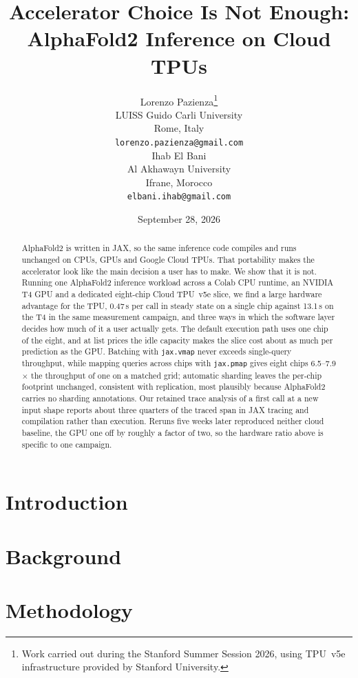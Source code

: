 \documentclass{article}
\title{Accelerator Choice Is Not Enough:\\
AlphaFold2 Inference on Cloud TPUs}
\date{September 28, 2026}
\author{
  Lorenzo Pazienza\thanks{Work carried out during the Stanford Summer
  Session 2026, using TPU~v5e infrastructure provided by Stanford
  University.} \\
  LUISS Guido Carli University \\
  Rome, Italy \\
  \texttt{lorenzo.pazienza@gmail.com} \\
  \And
  Ihab El Bani \\
  Al Akhawayn University \\
  Ifrane, Morocco \\
  \texttt{elbani.ihab@gmail.com} \\
}
\begin{document}
\maketitle

\begin{abstract}
AlphaFold2 is written in JAX, so the same inference code compiles and
runs unchanged on CPUs, GPUs and Google Cloud TPUs. That portability
makes the accelerator look like the main decision a user has to make.
We show that it is not. Running one AlphaFold2 inference workload
across a Colab CPU runtime, an NVIDIA T4 GPU and a dedicated eight-chip
Cloud TPU~v5e slice, we find a large hardware advantage for the TPU,
0.47\,s per call in steady state on a single chip against 13.1\,s on
the T4 in the same measurement campaign, and three ways in which the
software layer decides how much of it a user actually gets. The default
execution path uses one chip of the eight, and at list prices the idle
capacity makes the slice cost about as much per prediction as the GPU.
Batching with \texttt{jax.vmap} never exceeds single-query throughput,
while mapping queries across chips with \texttt{jax.pmap} gives eight
chips 6.5--7.9$\times$ the throughput of one on a matched grid;
automatic sharding leaves the per-chip footprint unchanged, consistent
with replication, most plausibly because AlphaFold2 carries no sharding
annotations. Our retained trace analysis of a first call at a new input
shape reports about three quarters of the traced span in JAX tracing
and compilation rather than execution. Reruns five weeks later
reproduced neither cloud baseline, the GPU one off by roughly a factor
of two, so the hardware ratio above is specific to one campaign.
\end{abstract}



\section{Introduction}\label{sec:introduction}


\section{Background}\label{sec:background}


\section{Methodology}\label{sec:methodology}

\end{document}
